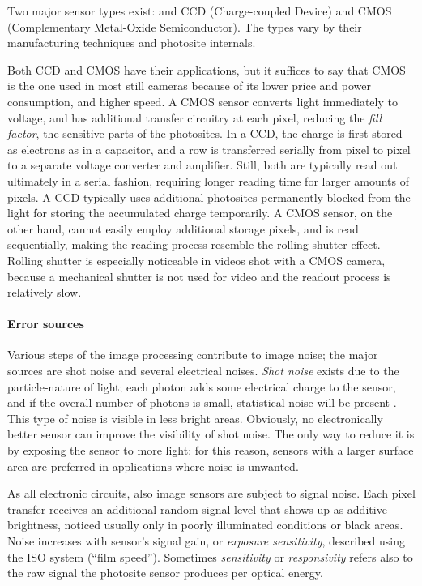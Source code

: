 Two major sensor types exist: and CCD (Charge-coupled Device) and CMOS (Complementary Metal-Oxide Semiconductor).
The types vary by their manufacturing techniques and photosite internals. \cite{taylor1998ccd,el2005cmos}

Both CCD and CMOS have their applications, but it suffices to say that CMOS is the one used in most still cameras because of its lower price and power consumption, and higher speed.
A CMOS sensor converts light immediately to voltage, and has additional transfer circuitry at each pixel, reducing the \emph{fill factor}, the sensitive parts of the photosites.
In a CCD, the charge is first stored as electrons as in a capacitor, and a row is transferred serially from pixel to pixel to a separate voltage converter and amplifier.
Still, both are typically read out ultimately in a serial fashion, requiring longer reading time for larger amounts of pixels.
A CCD typically uses additional photosites permanently blocked from the light for storing the accumulated charge temporarily.
A CMOS sensor, on the other hand, cannot easily employ additional storage pixels, and is read sequentially, making the reading process resemble the rolling shutter effect.
Rolling shutter is especially noticeable in videos shot with a CMOS camera, because a mechanical shutter is not used for video and the readout process is relatively slow.
\cite{taylor1998ccd,caspeelectronic,litwiller2001ccd}

\paragraph{Error sources}
Various steps of the image processing contribute to image noise; the major sources are shot noise and several electrical noises.
\emph{Shot noise} exists due to the particle-nature of light; each photon adds some electrical charge to the sensor, and if the overall number of photons is small, statistical noise will be present \cite{?}.
This type of noise is visible in less bright areas.
Obviously, no electronically better sensor can improve the visibility of shot noise.
The only way to reduce it is by exposing the sensor to more light: for this reason, sensors with a larger surface area are preferred in applications where noise is unwanted.

As all electronic circuits, also image sensors are subject to signal noise. %
Each pixel transfer receives an additional random signal level that shows up as additive brightness, noticed usually only in poorly illuminated conditions or black areas.
Noise increases with sensor's signal gain, or \emph{exposure sensitivity}, described using the ISO system (``film speed'').
Sometimes \emph{sensitivity} or \emph{responsivity} refers also to the raw signal the photosite sensor produces per optical energy. \cite{litwiller2001ccd}

